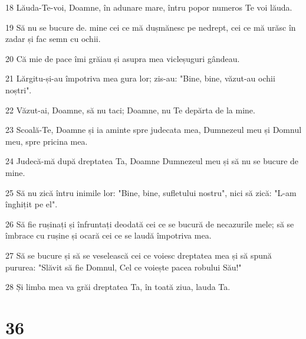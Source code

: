 \par 18 Lăuda-Te-voi, Doamne, în adunare mare, întru popor numeros Te voi lăuda.
\par 19 Să nu se bucure de. mine cei ce mă dușmănesc pe nedrept, cei ce mă urăsc în zadar și fac semn cu ochii.
\par 20 Că mie de pace îmi grăiau și asupra mea vicleșuguri gândeau.
\par 21 Lărgitu-și-au împotriva mea gura lor; zis-au: "Bine, bine, văzut-au ochii noștri".
\par 22 Văzut-ai, Doamne, să nu taci; Doamne, nu Te depărta de la mine.
\par 23 Scoală-Te, Doamne și ia aminte spre judecata mea, Dumnezeul meu și Domnul meu, spre pricina mea.
\par 24 Judecă-mă după dreptatea Ta, Doamne Dumnezeul meu și să nu se bucure de mine.
\par 25 Să nu zică întru inimile lor: "Bine, bine, sufletului nostru", nici să zică: "L-am înghițit pe el".
\par 26 Să fie rușinați și înfruntați deodată cei ce se bucură de necazurile mele; să se îmbrace cu rușine și ocară cei ce se laudă împotriva mea.
\par 27 Să se bucure și să se veselească cei ce voiesc dreptatea mea și să spună pururea: "Slăvit să fie Domnul, Cel ce voiește pacea robului Său!"
\par 28 Și limba mea va grăi dreptatea Ta, în toată ziua, lauda Ta.

\chapter{36}


